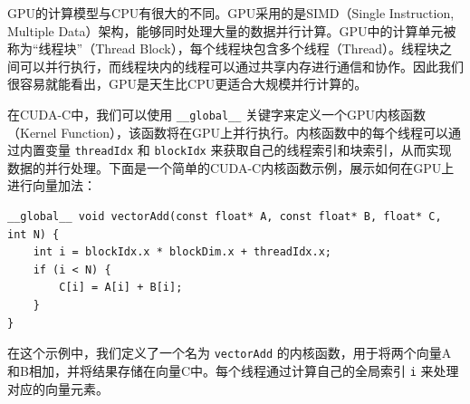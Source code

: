 GPU的计算模型与CPU有很大的不同。GPU采用的是SIMD（Single Instruction, Multiple Data）架构，能够同时处理大量的数据并行计算。GPU中的计算单元被称为“线程块”（Thread Block），每个线程块包含多个线程（Thread）。线程块之间可以并行执行，而线程块内的线程可以通过共享内存进行通信和协作。因此我们很容易就能看出，GPU是天生比CPU更适合大规模并行计算的。

在CUDA-C中，我们可以使用 \verb|__global__| 关键字来定义一个GPU内核函数（Kernel Function），该函数将在GPU上并行执行。内核函数中的每个线程可以通过内置变量 \verb|threadIdx| 和 \verb|blockIdx| 来获取自己的线程索引和块索引，从而实现数据的并行处理。下面是一个简单的CUDA-C内核函数示例，展示如何在GPU上进行向量加法：
\begin{verbatim}
__global__ void vectorAdd(const float* A, const float* B, float* C, int N) {
    int i = blockIdx.x * blockDim.x + threadIdx.x;
    if (i < N) {
        C[i] = A[i] + B[i];
    }
}
\end{verbatim}
在这个示例中，我们定义了一个名为 \verb|vectorAdd| 的内核函数，用于将两个向量A和B相加，并将结果存储在向量C中。每个线程通过计算自己的全局索引 \verb|i| 来处理对应的向量元素。

